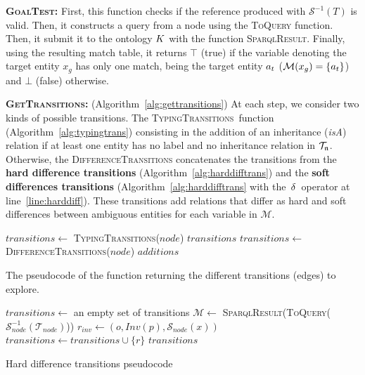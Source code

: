 \documentclass[a4paper,11pt,twoside]{StyleThese}
\begin{document}
\textbf{\textsc{GoalTest}:}
First, this function checks if the reference produced with $\mathcal{S}^{-1}(T)$ is valid. Then, it constructs a \sparql{} query from a node using the \textsc{ToQuery} function. Then, it submit it to the ontology $K$ with the function \textsc{SparqlResult}. Finally, using the resulting match table, it returns $\top$ (true) if the variable denoting the target entity $x_g$ has only one match, being the target entity $a_t$ ($\mathcal{M}(x_g) = \{a_t\}$) and $\bot$ (false) otherwise.

\textbf{\textsc{GetTransitions}:}
(Algorithm~\ref{alg:gettransitions}) At each step, we consider two kinds of possible transitions. The \textsc{TypingTransitions}~function (Algorithm~\ref{alg:typingtrans}) consisting in the addition of an inheritance (\textit{isA}) relation if at least one entity has no label and no inheritance relation in $\mathcal{T}_{\mathfrak{n}}$. Otherwise, the \textsc{DifferenceTransitions} concatenates the transitions from the \textbf{hard difference transitions} (Algorithm~\ref{alg:harddifftrans}) and the \textbf{soft differences transitions} (Algorithm~\ref{alg:harddifftrans} with the $\,\delta\,$ operator at line~\ref{line:harddiff}). These transitions add relations that differ as hard and soft differences between ambiguous entities for each variable in $\mathcal{M}$.

\begin{algorithm}[htpb]
\begin{algorithmic}[1]
\State $transitions\leftarrow$ \textsc{TypingTransitions}($node$)
	\State \Return $transitions$
\EndIf
\State $transitions\leftarrow$ \textsc{DifferenceTransitions}($node$)
\State \Return $additions$
\EndFunction
\end{algorithmic}
 \caption{The pseudocode of the function returning the different transitions (edges) to explore.}
 \label{alg:gettransitions}
\end{algorithm}

\begin{algorithm}[htb]
\begin{algorithmic}[1]
\State $transitions\leftarrow$ an empty set of transitions
\State $\mathcal{M}\leftarrow$ \textsc{SparqlResult}(\textsc{ToQuery}($\mathcal{S}_{node}^{-1}(\mathcal{T}_{node})$))
			 \label{line:harddiff}
				\State $r_{inv} \leftarrow (o, Inv(p), \mathcal{S}_{node}(x))$
					\State $transitions \leftarrow transitions \cup \{r\}$
				\EndIf
			\EndFor
		\EndIf
	\EndFor
\EndFor
\State \Return $transitions$
\EndFunction
\end{algorithmic}
 \caption{Hard difference transitions pseudocode}
 \label{alg:harddifftrans}
\end{algorithm}
\end{document}

